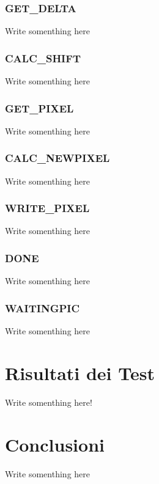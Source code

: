 \documentclass[11pt, a4paper]{article}
\begin{document}
\subsubsection{GET\_DELTA}
Write somenthing here

\subsubsection{CALC\_SHIFT}
Write somenthing here

\subsubsection{GET\_PIXEL}
Write somenthing here

\subsubsection{CALC\_NEWPIXEL}
Write somenthing here

\subsubsection{WRITE\_PIXEL}
Write somenthing here

\subsubsection{DONE}
Write somenthing here

\subsubsection{WAITINGPIC}
Write somenthing here

\section{Risultati dei Test}
Write somenthing here!

\section{Conclusioni}
Write somenthing here
\end{document}
